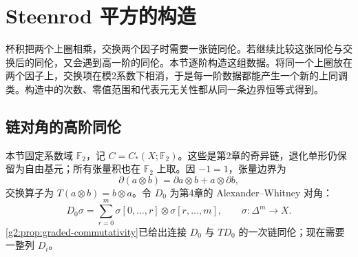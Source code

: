 
% 
% 

\section{Steenrod 平方的构造}
\label{g2:sec:1302}

杯积把两个上圈相乘，交换两个因子时需要一张链同伦。若继续比较这张同伦与交换后的同伦，又会遇到高一阶的同伦。本节逐阶构造这组数据。将同一个上圈放在两个因子上，交换项在模2系数下相消，于是每一阶数据都能产生一个新的上同调类。构造中的次数、零值范围和代表元无关性都从同一条边界恒等式得到。

\subsection{链对角的高阶同伦}
\label{g2:subsec:1302:01}

本节固定系数域 \(\mathbb F_2\)，记 \(C=C_*(X;\mathbb F_2)\)。这些是第2章的奇异链，退化单形仍保留为自由基元；所有张量积也在 \(\mathbb F_2\) 上取。因 \(-1=1\)，张量边界为
\[
	\partial(a\otimes b)=\partial a\otimes b+a\otimes\partial b,
\]
交换算子为 \(T(a\otimes b)=b\otimes a\)。令 \(D_0\) 为第4章的 Alexander--Whitney 对角：
\[
	D_0\sigma=\sum_{r=0}^m\sigma[0,\ldots,r]\otimes\sigma[r,\ldots,m],\qquad \sigma:\Delta^m\to X.
\]
\cref{g2:prop:graded-commutativity}已给出连接 \(D_0\) 与 \(TD_0\) 的一次链同伦；现在需要一整列 \(D_i\)。

